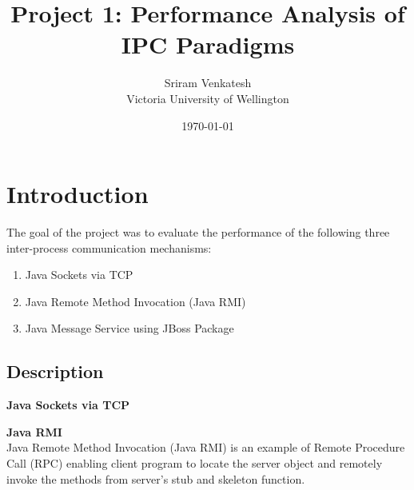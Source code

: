 \documentclass{article}
\title{Project 1: Performance Analysis of IPC Paradigms } %
\author{Sriram Venkatesh \\ Victoria University of Wellington} %
\date{\today} %
\begin{document}
\maketitle %



\section{Introduction}
The goal of the project was to evaluate the performance of the following three inter-process communication mechanisms:

\begin{enumerate}
\item Java Sockets via TCP
\item Java Remote Method Invocation (Java RMI)
\item Java Message Service using JBoss Package
\end{enumerate}

\subsection{Description}
\textbf{Java Sockets via TCP} \\ 



\textbf{Java RMI} \\
Java Remote Method Invocation (Java RMI) is an example of Remote Procedure Call (RPC) enabling client program to locate the server object and remotely invoke the methods from server's stub and skeleton function. \\
\end{document}
